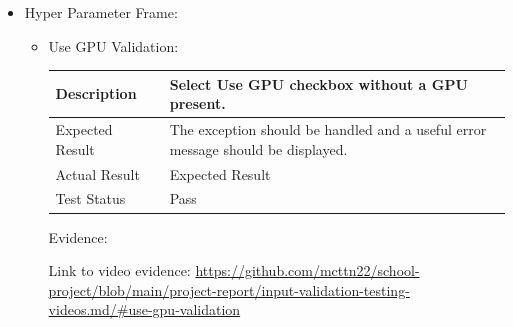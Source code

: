\documentclass[./project-report/src/latex/project-report.tex]{subfiles}
\begin{document}
\begin{itemize}
    \item Hyper Parameter Frame:
    \label{sec:hyper-parameter-frame-input-validation}
    \begin{itemize}
        \item Use GPU Validation: \newline\newline
			\begin{tabular}{|p{0.25\linewidth}|p{0.75\linewidth}|}
				\hline
				Description & Select Use GPU checkbox without a GPU present. \\
				\hline
				Expected Result & The exception should be handled and a useful error message should be displayed. \\
				\hline
				Actual Result & Expected Result \\
				\hline
				Test Status & Pass \\
				\hline
			\end{tabular}

			\vspace{5mm}

			Evidence:
			\begin{figure}[h!]
			\centering
			\end{figure}

			Link to video evidence: \url{https://github.com/mcttn22/school-project/blob/main/project-report/input-validation-testing-videos.md/#use-gpu-validation}

        \pagebreak


\end{itemize}
\end{itemize}
\end{document}
